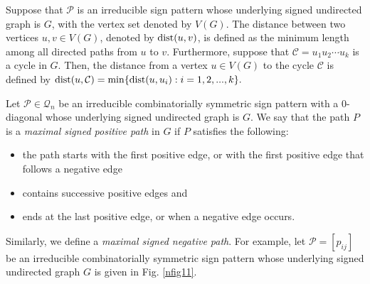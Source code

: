 \documentclass[a4paper, 10pt]{article}
\numberwithin{equation}{section}
\def\min{{\rm min}}
\def\dist{{\rm dist}}
\begin{document}
	
	
	Suppose that $\mathcal{P} $ is an irreducible sign pattern whose underlying signed undirected graph is $G$, with the vertex set denoted by $V(G)$.
	The distance between two vertices $u,v\in V(G)$, denoted by $\dist(u,v)$, is defined as the minimum length among all directed paths from $u$ to $v$. Furthermore, suppose that $\mathcal{C}=u_1u_2\cdots u_k$ is a cycle in $G$. Then, the distance from a vertex $u\in V(G)$ to the cycle $\mathcal{C}$ is defined by $\dist(u,\mathcal{C})=\min\{\dist(u,u_i): i=1,2,...,k\}.$
	
	
	
	
	
	Let $\mathcal{P} \in \mathcal{Q}_n$ be an irreducible combinatorially symmetric sign pattern with a $0$-diagonal whose underlying signed undirected graph is $G$. We say that the path $P$ is a \textit{maximal signed positive path} in $G$  if $P$ satisfies the following: 
	\begin{itemize}
		\item[i.] the path starts with the first positive edge, 
		or with the first positive edge that follows a negative edge
		\item[ii.] contains successive 
		positive edges and
		\item[iii.] ends at the last positive edge, or when a negative edge occurs. 
	\end{itemize}
	Similarly, we define a \textit{maximal signed negative path}.  
	For example, let $\mathcal{P}=[p_{ij}]$ be an irreducible combinatorially symmetric sign pattern whose underlying signed undirected graph $G$ is given in Fig. \ref{nfig11}. 
	
\end{document}
